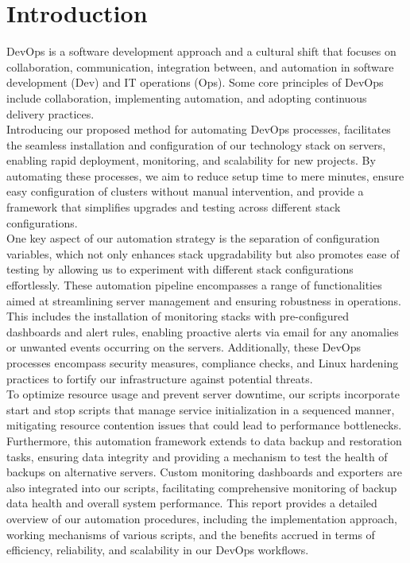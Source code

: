 \documentclass[12pt,a4paper,oneside]{report}
\begin{document}
\newpage
{}
\chapter{Introduction}
DevOps is a software development approach and a cultural shift that focuses on collaboration, communication, integration between, and automation in software development (Dev) and IT operations (Ops). Some core principles of DevOps include collaboration, implementing automation, and adopting continuous delivery practices.  \\
Introducing our proposed method for automating DevOps processes,  facilitates the seamless installation and configuration of our technology stack on servers, enabling rapid deployment, monitoring, and scalability for new projects. By automating these processes, we aim to reduce setup time to mere minutes, ensure easy configuration of clusters without manual intervention, and provide a framework that simplifies upgrades and testing across different stack configurations.\\
\newline
\hspace{1cm} One key aspect of our automation strategy is the separation of configuration variables, which not only enhances stack upgradability but also promotes ease of testing by allowing us to experiment with different stack configurations effortlessly. These automation pipeline encompasses a range of functionalities aimed at streamlining server management and ensuring robustness in operations. This includes the installation of monitoring stacks with pre-configured dashboards and alert rules, enabling proactive alerts via email for any anomalies or unwanted events occurring on the servers. Additionally, these DevOps processes encompass security measures, compliance checks, and Linux hardening practices to fortify our infrastructure against potential threats.\\
\newline
\hspace{1cm} To optimize resource usage and prevent server downtime, our scripts incorporate start and stop scripts that manage service initialization in a sequenced manner, mitigating resource contention issues that could lead to performance bottlenecks.\\
\newline
\hspace{1cm} Furthermore, this automation framework extends to data backup and restoration tasks, ensuring data integrity and providing a mechanism to test the health of backups on alternative servers. Custom monitoring dashboards and exporters are also integrated into our scripts, facilitating comprehensive monitoring of backup data health and overall system performance. This report provides a detailed overview of our automation procedures, including the implementation approach, working mechanisms of various scripts, and the benefits accrued in terms of efficiency, reliability, and scalability in our DevOps workflows.\\
\end{document}
